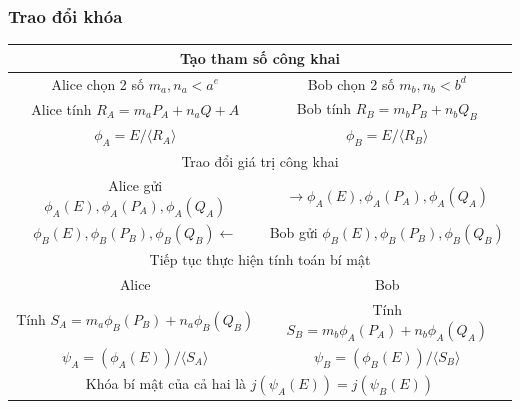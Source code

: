 \documentclass [xcolor=svgnames, t] {beamer}
\theoremstyle{definition}
\begin{document}
\begin{frame}
    \frametitle{Trao đổi khóa}

    \begin{center}
        \small
        \begin{tabular}{|c|c|}
            \hline
            \multicolumn{2}{|c|}{Tạo tham số công khai}                                                                  \\
            \hline
            \hline
            Alice chọn 2 số $m_a, n_a < a^e$                     & Bob chọn 2 số $m_b, n_b < b^d$                        \\
            \hline
            Alice tính $R_A =  m_aP_A+ n_aQ+A$                   & Bob tính $R_B = m_bP_B+ n_bQ_B$                       \\
            \hline
            $\phi_A = E/\langle R_A\rangle $                     & $\phi_B = E/\langle R_B\rangle $                      \\
            \hline
            \hline
            \multicolumn{2}{|c|}{Trao đổi giá trị công khai}                                                             \\
            \hline
            Alice gửi $\phi_A(E), \phi_A(P_A), \phi_A(Q_A)$      & $\longrightarrow \phi_A(E), \phi_A(P_A), \phi_A(Q_A)$ \\
            $\phi_B(E), \phi_B(P_B), \phi_B(Q_B) \longleftarrow$ & Bob gửi $\phi_B(E), \phi_B(P_B), \phi_B(Q_B)$         \\
            \hline
            \hline
            \multicolumn{2}{|c|}{Tiếp tục thực hiện tính toán bí mật}                                                    \\
            \hline
            Alice                                                & Bob                                                   \\
            \hline
            Tính $S_A = m_a \phi_B(P_B)+n_a\phi_B(Q_B)$          & Tính $S_B = m_b \phi_A(P_A)+n_b\phi_A(Q_A)$           \\
            \hline
            $\psi_A =(\phi_A(E))/\langle S_A\rangle $            & $\psi_B =(\phi_B(E))/\langle S_B\rangle $             \\
            \hline
            \multicolumn{2}{|c|}{Khóa bí mật của cả hai là $j(\psi_A(E)) = j(\psi_B(E))$ }                               \\
            \hline
        \end{tabular}

    \end{center}


\end{frame}
\end{document}
